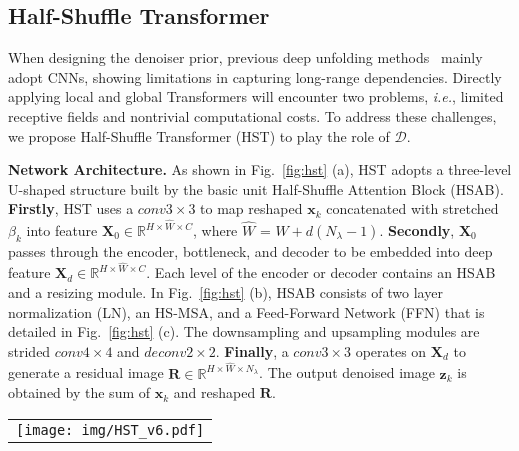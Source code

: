 \documentclass{article}
\begin{document}
\subsection{Half-Shuffle Transformer}
\vspace{-1.5mm}
When designing the denoiser prior, previous deep unfolding methods~\cite{dnu,hssp,gapnet,admm-net} mainly adopt CNNs, showing limitations in capturing long-range dependencies. Directly applying local and global Transformers will encounter two problems, \emph{i.e.}, limited receptive fields and nontrivial computational costs. To address these challenges, we propose  Half-Shuffle Transformer  (HST) to play the role of $\mathcal{D}$.

\textbf{Network Architecture.}  As shown in Fig.~\ref{fig:hst} (a), HST adopts a three-level U-shaped structure  built by the basic unit Half-Shuffle Attention Block (HSAB). \textbf{Firstly}, HST uses a $conv3\times3$ to map reshaped $\mathbf{x}_k$ concatenated with stretched $\beta_k$ into feature $\mathbf{X}_0\in \mathbb{R}^{H\times \hat{W}\times C}$, where $\hat{W}$ = $W+d(N_\lambda-1)$. \textbf{Secondly}, $\mathbf{X}_0$ passes through the encoder, bottleneck, and decoder to be embedded into deep feature $\mathbf{X}_d\in \mathbb{R}^{H\times \hat{W}\times C}$. Each level of the encoder or decoder contains an HSAB and a resizing module.  In Fig.~\ref{fig:hst} (b), HSAB consists of two layer normalization (LN), an HS-MSA, and a Feed-Forward Network (FFN) that is detailed in Fig.~\ref{fig:hst} (c). The downsampling and upsampling modules are strided $conv4\times4$ and $deconv2\times2$. \textbf{Finally}, a $conv3\times3$ operates on $\mathbf{X}_d$ to generate a residual image  $\mathbf{R}\in \mathbb{R}^{H\times \hat{W}\times N_\lambda}$. The output denoised image $\mathbf{z}_k$ is obtained by the sum of $\mathbf{x}_k$ and reshaped $\mathbf{R}$.

\begin{figure*}[t]
	\begin{center}
		\begin{tabular}[t]{c} \hspace{-3.4mm}
			\texttt{[image: img/HST\_v6.pdf]}
		\end{tabular}
	\end{center}
	\vspace*{-3mm}
	\caption{\small Diagram of HST. (a) HST adopts a U-shaped structure. (b) HSAB consists of an FFN, an HS-MSA, and two layer normalization. (c) Components of FFN. (d) HS-MSA contains $local~branch$ and $non$-$local~branch$.}
	\label{fig:hst}
	\vspace{-3mm}
\end{figure*}
\end{document}
